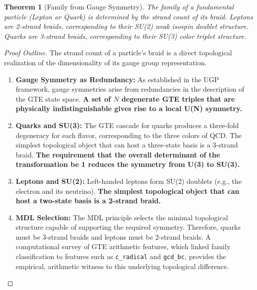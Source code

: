 \documentclass[11pt]{article}
\newtheorem{theorem}{Theorem}[section]
\theoremstyle{remark}
\begin{document}
\begin{theorem}[Family from Gauge Symmetry]
\label{thm:family}
The family of a fundamental particle (Lepton or Quark) is determined by the strand count of its braid. Leptons are 2-strand braids, corresponding to their SU(2) weak isospin doublet structure. Quarks are 3-strand braids, corresponding to their SU(3) color triplet structure.
\end{theorem}
\begin{proof}[Proof Outline]
The strand count of a particle's braid is a direct topological realization of the dimensionality of its gauge group representation.
\begin{enumerate}[leftmargin=*,itemsep=2pt]
    \item \textbf{Gauge Symmetry as Redundancy:} As established in the UGP framework, gauge symmetries arise from redundancies in the description of the GTE state space. \textbf{A set of $N$ degenerate GTE triples that are physically indistinguishable gives rise to a local U(N) symmetry.}
    \item \textbf{Quarks and SU(3):} The GTE cascade for quarks produces a three-fold degeneracy for each flavor, corresponding to the three colors of QCD. The simplest topological object that can host a three-state basis is a 3-strand braid. \textbf{The requirement that the overall determinant of the transformation be 1 reduces the symmetry from U(3) to SU(3).}
    \item \textbf{Leptons and SU(2):} Left-handed leptons form SU(2) doublets (e.g., the electron and its neutrino). \textbf{The simplest topological object that can host a two-state basis is a 2-strand braid.}
    \item \textbf{MDL Selection:} The MDL principle selects the minimal topological structure capable of supporting the required symmetry. Therefore, quarks must be 3-strand braids and leptons must be 2-strand braids. A computational survey of GTE arithmetic features, which linked family classification to features such as \texttt{c\_radical} and \texttt{gcd\_bc}, provides the empirical, arithmetic witness to this underlying topological difference.
\end{enumerate}
\end{proof}
\end{document}
